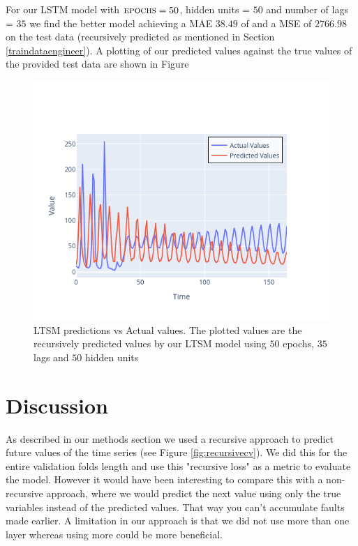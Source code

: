 \documentclass[conference]{IEEEtran}
\begin{document}
For our LSTM model with $\textsc{epochs} = 50$, hidden units = $50$ and number of lags = $35$ we 
find the better model achieving a MAE $38.49$ of and a MSE of $2766.98$ on the test data 
(recursively predicted as mentioned in Section \ref{traindataengineer}). A plotting of our 
predicted values against the true values of the provided test data are shown in Figure

\begin{figure}
    \includegraphics[scale=0.5]{pictures/newmodelresultlag35hu50.png}
    \caption{LTSM predictions vs Actual values. The plotted values are the recursively predicted 
    values by our LTSM model using $50$ epochs, $35$ lags and $50$ hidden units}
    \label{fig:modelresults}
\end{figure}

\section{Discussion}
As described in our methods section we used a recursive approach to predict future values of the 
time series (see Figure \ref{fig:recursivecv}). We did this for the entire validation folds length 
and use this "recursive loss" as a metric to evaluate the model. However it would have been 
interesting to compare this with a non-recursive approach, where we would predict the next value 
using only the true variables instead of the predicted values. That way you can't accumulate faults 
made earlier.  
A limitation in our approach is that we did not use more than one layer whereas using more could be
more beneficial.
\end{document}
